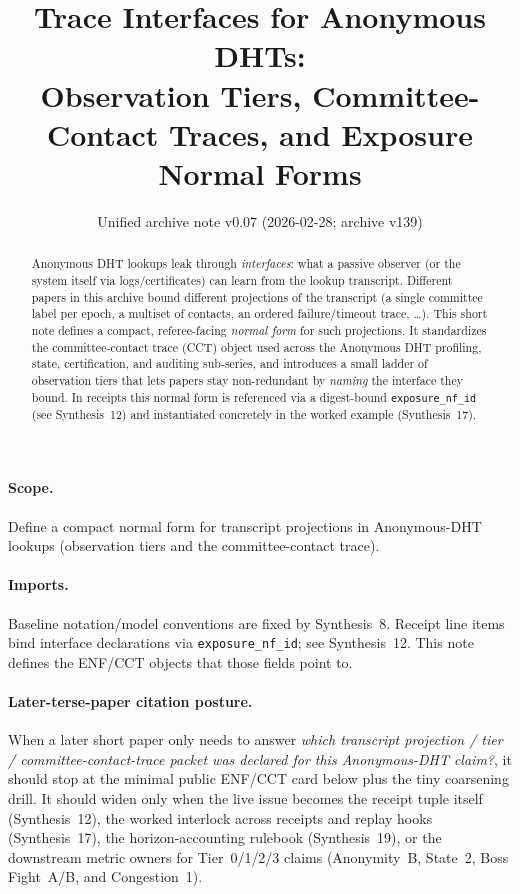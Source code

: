 \documentclass[11pt]{article}
\title{Trace Interfaces for Anonymous DHTs:\\ Observation Tiers, Committee-Contact Traces, and Exposure Normal Forms}
\author{}
\date{Unified archive note v0.07 (2026-02-28; archive v139)}
\begin{document}
\maketitle

\begin{abstract}
Anonymous DHT lookups leak through \emph{interfaces}: what a passive observer (or the system itself via logs/certificates) can learn from the lookup transcript.
Different papers in this archive bound different projections of the transcript (a single committee label per epoch, a multiset of contacts, an ordered failure/timeout trace, \ldots).
This short note defines a compact, referee-facing \emph{normal form} for such projections.
It standardizes the committee-contact trace (CCT) object used across the Anonymous DHT profiling, state, certification, and auditing sub-series, and introduces a small ladder of observation tiers that lets papers stay non-redundant by \emph{naming} the interface they bound.
In receipts this normal form is referenced via a digest-bound \texttt{exposure\_nf\_id} (see Synthesis~12) and instantiated concretely in the worked example (Synthesis~17).
\end{abstract}

\paragraph{Scope.}
Define a compact normal form for transcript projections in Anonymous-DHT lookups (observation tiers and the committee-contact trace).

\paragraph{Imports.}
Baseline notation/model conventions are fixed by Synthesis~8.\cite{series:notation}
Receipt line items bind interface declarations via \texttt{exposure\_nf\_id}; see Synthesis~12.\cite{series:receiptitems}
This note defines the ENF/CCT objects that those fields point to.

\paragraph{Later-terse-paper citation posture.}
When a later short paper only needs to answer \emph{which transcript projection / tier / committee-contact-trace packet was declared for this Anonymous-DHT claim?}, it should stop at the minimal public ENF/CCT card below plus the tiny coarsening drill.
It should widen only when the live issue becomes the receipt tuple itself (Synthesis~12), the worked interlock across receipts and replay hooks (Synthesis~17), the horizon-accounting rulebook (Synthesis~19), or the downstream metric owners for Tier~0/1/2/3 claims (Anonymity~B, State~2, Boss Fight~A/B, and Congestion~1).\cite{series:receiptitems,series:workedexample,series:accountingrulebook,series:profiling,series:state2,series:bossfightA,series:bossfightB,series:congeq}
\end{document}
